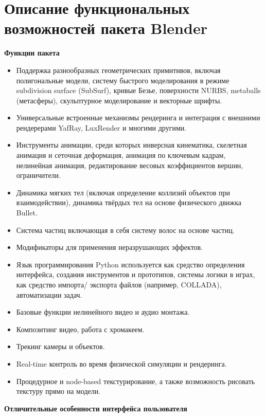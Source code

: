 \documentclass[areasetadvanced]{scrartcl}
\begin{document}
\section{Описание функциональных возможностей пакета Blender}
\begin{center}
    \textbf{Функции пакета}
\end{center}
\begin{itemize}
\item Поддержка разнообразных геометрических примитивов, включая полигональные модели,
систему быстрого моделирования в режиме subdivision surface (SubSurf), кривые Безье,
поверхности NURBS, metaballs (метасферы), скульптурное моделирование и векторные
шрифты.
\item Универсальные встроенные механизмы рендеринга и интеграция с внешними рендерерами
YafRay, LuxRender и многими другими.
\item Инструменты анимации, среди которых инверсная кинематика, скелетная анимация и
сеточная деформация, анимация по ключевым кадрам, нелинейная анимация,
редактирование весовых коэффициентов вершин, ограничители.
\item Динамика мягких тел (включая определение коллизий объектов при взаимодействии),
динамика твёрдых тел на основе физического движка Bullet.
\item Система частиц включающая в себя систему волос на основе частиц.
\item Модификаторы для применения неразрушающих эффектов.
\item Язык программирования Python используется как средство определения интерфейса,
создания инструментов и прототипов, системы логики в играх, как средство импорта/
экспорта файлов (например, COLLADA), автоматизации задач.
\item Базовые функции нелинейного видео и аудио монтажа.
\item Композитинг видео, работа с хромакеем.
\item Трекинг камеры и объектов.
\item Real-time контроль во время физической симуляции и рендеринга.
\item Процедурное и node-based текстурирование, а также возможность рисовать текстуру прямо
на модели.
\end{itemize}
\begin{center}
    \textbf{Отличительные особенности интерфейса пользователя}
\end{center}
\end{document}
